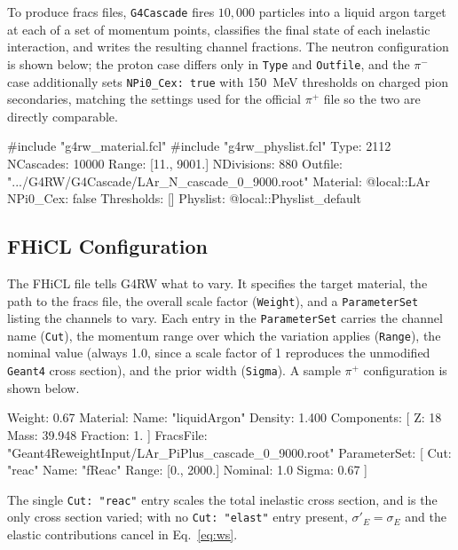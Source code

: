 \documentclass[%
article,
nofootinbib
]{revtex4-2}
\DeclareRobustCommand{\pip}{$\pi^{+}$}
\DeclareRobustCommand{\gfour}{\texttt{Geant4}}
\begin{document}
To produce fracs files, \texttt{G4Cascade} fires $10,000$ particles into a liquid argon target at
each of a set of momentum points, classifies the final state of each
inelastic interaction, and writes the resulting channel fractions. The neutron configuration is shown below; the
proton case differs only in \texttt{Type} and \texttt{Outfile}, and the
$\pi^{-}$ case additionally sets \texttt{NPi0\_Cex: true} with 150~MeV
thresholds on charged pion secondaries, matching the settings used for the
official $\pi^{+}$ file so the two are directly comparable.

\begin{bashcode}
#include "g4rw_material.fcl"
#include "g4rw_physlist.fcl"
Type:       2112
NCascades:  10000
Range:      [11., 9001.]
NDivisions: 880
Outfile:    ".../G4RW/G4Cascade/LAr_N_cascade_0_9000.root"
Material:   @local::LAr
NPi0_Cex:   false
Thresholds: []
Physlist:   @local::Physlist_default
\end{bashcode}


\subsection{\label{subsec:fcl}FHiCL Configuration}

The FHiCL file tells G4RW what to vary. It specifies the target material, the
path to the fracs file, the overall scale factor (\texttt{Weight}), and a
\texttt{ParameterSet} listing the channels to vary. Each entry in the
\texttt{ParameterSet} carries the channel name (\texttt{Cut}), the momentum
range over which the variation applies (\texttt{Range}), the nominal value
(always 1.0, since a scale factor of 1
reproduces the unmodified \gfour{} cross section), and the prior width (\texttt{Sigma}). A sample \pip{} configuration
is shown below.

\begin{bashcode}
Weight: 0.67
Material: {
  Name: "liquidArgon"
  Density: 1.400
  Components: [
    { Z: 18
      Mass: 39.948
      Fraction: 1. }
  ]
}
FracsFile: "Geant4ReweightInput/LAr_PiPlus_cascade_0_9000.root"
ParameterSet: [
  { Cut: "reac"
    Name: "fReac"
    Range: [0., 2000.]
    Nominal: 1.0
    Sigma: 0.67 }
]
\end{bashcode}

\noindent
The single \texttt{Cut: "reac"} entry scales the total inelastic cross
section, and is the only cross section varied; with no \texttt{Cut:
"elast"} entry present, $\sigma'_E = \sigma_E$ and the elastic
contributions cancel in Eq.~\ref{eq:ws}.
\end{document}
